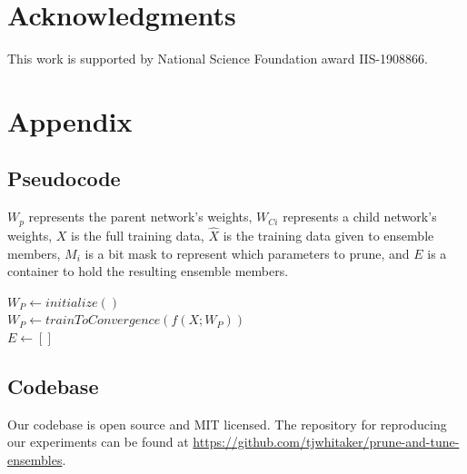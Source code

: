 \documentclass[letterpaper]{article} %
\begin{document}
\section{Acknowledgments}

This work is supported by National Science Foundation award IIS-1908866.



\appendix

\section{Appendix}

\subsection{Pseudocode}

$W_p$ represents the parent network's weights, $W_{Ci}$ represents a child network's weights, $X$ is the full training data, $\hat{X}$ is the training data given to ensemble members, $M_i$ is a bit mask to represent which parameters to prune, and $E$ is a container to hold the resulting ensemble members.

\begin{algorithm}[!h]
\SetAlgoLined
 $W_P \leftarrow initialize()$ \\ 
 $W_P \leftarrow trainToConvergence(f(X; W_P))$ \\ 
 $E \leftarrow []$ \\ 
 
 \caption{Prune and Tune Ensemble Algorithm}
\end{algorithm}

\subsection{Codebase}

Our codebase is open source and MIT licensed. The repository for reproducing our experiments can be found at \url{https://github.com/tjwhitaker/prune-and-tune-ensembles}.
\end{document}
